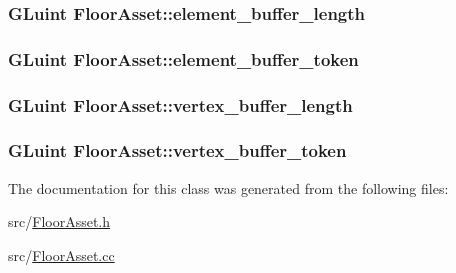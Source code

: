 \subsubsection[{element\+\_\+buffer\+\_\+length}]{\setlength{\rightskip}{0pt plus 5cm}G\+Luint Floor\+Asset\+::element\+\_\+buffer\+\_\+length\hspace{0.3cm}{\ttfamily [private]}}\label{classFloorAsset_ad42145830ac04a31ca27fd290cf0ef08}
\hypertarget{classFloorAsset_ab9be3a61a423156c7e79c73cd1cd5fc4}{}
\subsubsection[{element\+\_\+buffer\+\_\+token}]{\setlength{\rightskip}{0pt plus 5cm}G\+Luint Floor\+Asset\+::element\+\_\+buffer\+\_\+token\hspace{0.3cm}{\ttfamily [private]}}\label{classFloorAsset_ab9be3a61a423156c7e79c73cd1cd5fc4}
\hypertarget{classFloorAsset_a9edf10bbcfbc61006fafb4a10d826a76}{}
\subsubsection[{vertex\+\_\+buffer\+\_\+length}]{\setlength{\rightskip}{0pt plus 5cm}G\+Luint Floor\+Asset\+::vertex\+\_\+buffer\+\_\+length\hspace{0.3cm}{\ttfamily [private]}}\label{classFloorAsset_a9edf10bbcfbc61006fafb4a10d826a76}
\hypertarget{classFloorAsset_a5fdd868b2e2a52dabfe2387c903e3862}{}
\subsubsection[{vertex\+\_\+buffer\+\_\+token}]{\setlength{\rightskip}{0pt plus 5cm}G\+Luint Floor\+Asset\+::vertex\+\_\+buffer\+\_\+token\hspace{0.3cm}{\ttfamily [private]}}\label{classFloorAsset_a5fdd868b2e2a52dabfe2387c903e3862}


The documentation for this class was generated from the following files\+:\begin{DoxyCompactItemize}
\item 
src/\hyperlink{FloorAsset_8h}{Floor\+Asset.\+h}\item 
src/\hyperlink{FloorAsset_8cc}{Floor\+Asset.\+cc}\end{DoxyCompactItemize}
